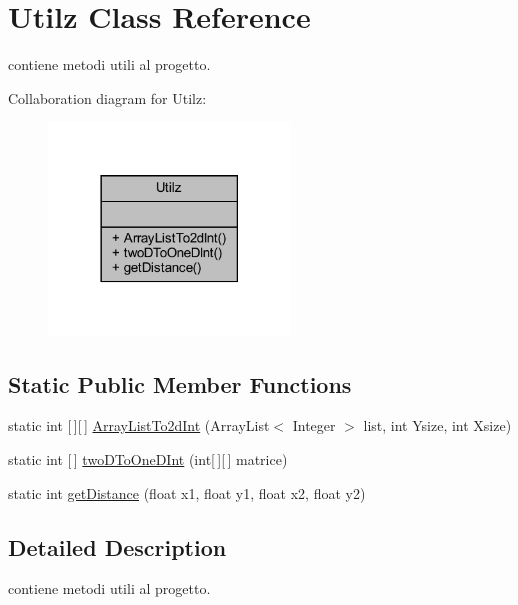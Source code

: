 \hypertarget{classhelpz_1_1_utilz}{}\section{Utilz Class Reference}
\label{classhelpz_1_1_utilz}


contiene metodi utili al progetto.  




Collaboration diagram for Utilz\+:\nopagebreak
\begin{figure}[H]
\begin{center}
\leavevmode
\includegraphics[width=182pt]{classhelpz_1_1_utilz__coll__graph}
\end{center}
\end{figure}
\subsection*{Static Public Member Functions}
\begin{DoxyCompactItemize}
\item 
static int \mbox{[}$\,$\mbox{]}\mbox{[}$\,$\mbox{]} \hyperlink{classhelpz_1_1_utilz_a3f701300276e5102efe8c55e65192dec}{Array\+List\+To2d\+Int} (Array\+List$<$ Integer $>$ list, int Ysize, int Xsize)
\item 
static int \mbox{[}$\,$\mbox{]} \hyperlink{classhelpz_1_1_utilz_a3a92fdb2e1e33fa3daadbdea23200fcc}{two\+D\+To\+One\+D\+Int} (int\mbox{[}$\,$\mbox{]}\mbox{[}$\,$\mbox{]} matrice)
\item 
static int \hyperlink{classhelpz_1_1_utilz_a8a4c702547acd44cb113b787ae1d3e05}{get\+Distance} (float x1, float y1, float x2, float y2)
\end{DoxyCompactItemize}


\subsection{Detailed Description}
contiene metodi utili al progetto. 

